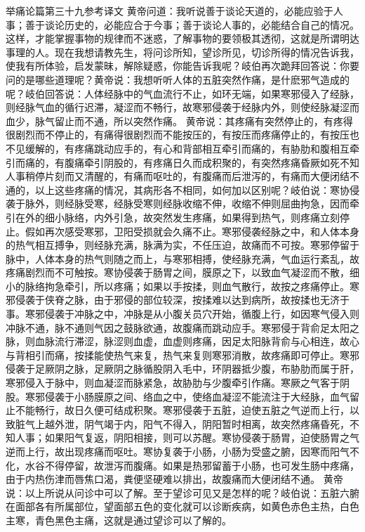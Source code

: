 \documentclass[a4paper,12pt,UTF8,twoside]{ctexbook}
\begin{document}
举痛论篇第三十九参考译文
黄帝问道：我听说善于谈论天道的，必能应验于人事；善于谈论历史的，必能应合于今事；善于谈论人事的，必能结合自己的情况。这样，才能掌握事物的规律而不迷惑，了解事物的要领极其透彻，这就是所谓明达事理的人。现在我想请教先生，将问诊所知，望诊所见，切诊所得的情况告诉我，使我有所体验，启发蒙昧，解除疑惑，你能告诉我呢？岐伯再次跪拜回答说：你要问的是哪些道理呢？黄帝说：我想听听人体的五脏突然作痛，是什麽邪气造成的呢？岐伯回答说：人体经脉中的气血流行不止，如环无端，如果寒邪侵入了经脉，则经脉气血的循行迟滞，凝涩而不畅行，故寒邪侵袭于经脉内外，则使经脉凝涩而血少，脉气留止而不通，所以突然作痛。
黄帝说：其疼痛有突然停止的，有疼得很剧烈而不停止的，有痛得很剧烈而不能按压的，有按压而疼痛停止的，有按压也不见缓解的，有疼痛跳动应手的，有心和背部相互牵引而痛的，有胁肋和腹相互牵引而痛的，有腹痛牵引阴股的，有疼痛日久而成积聚的，有突然疼痛昏厥如死不知人事稍停片刻而又清醒的，有痛而呕吐的，有腹痛而后泄泻的，有痛而大便闭结不通的，以上这些疼痛的情况，其病形各不相同，如何加以区别呢？岐伯说：寒协侵袭于脉外，则经脉受寒，经脉受寒则经脉收缩不伸，收缩不伸则屈曲拘急，因而牵引在外的细小脉络，内外引急，故突然发生疼痛，如果得到热气，则疼痛立刻停止。假如再次感受寒邪，卫阳受损就会久痛不止。寒邪侵袭经脉之中，和人体本身的热气相互搏争，则经脉充满，脉满为实，不任压迫，故痛而不可按。寒邪停留于脉中，人体本身的热气则随之而上，与寒邪相搏，使经脉充满，气血运行紊乱，故疼痛剧烈而不可触按。寒协侵袭于肠胃之间，膜原之下，以致血气凝涩而不散，细小的脉络拘急牵引，所以疼痛；如果以手按揉，则血气散行，故按之疼痛停止。寒邪侵袭于侠脊之脉，由于邪侵的部位较深，按揉难以达到病所，故按揉也无济于事。寒邪侵袭于冲脉之中，冲脉是从小腹关员穴开始，循腹上行，如因寒气侵入则冲脉不通，脉不通则气因之鼓脉欲通，故腹痛而跳动应手。寒邪侵于背俞足太阳之脉，则血脉流行滞涩，脉涩则血虚，血虚则疼痛，因足太阳脉背俞与心相连，故心与背相引而痛，按揉能使热气来复，热气来复则寒邪消散，故疼痛即可停止。寒邪侵袭于足厥阴之脉，足厥阴之脉循股阴入毛中，环阴器抵少腹，布胁肋而属于肝，寒邪侵入于脉中，则血凝涩而脉紧急，故胁肋与少腹牵引作痛。寒厥之气客于阴股。寒邪侵袭于小肠膜原之间、络血之中，使络血凝涩不能流注于大经脉，血气留止不能畅行，故日久便可结成积聚。寒邪侵袭于五脏，迫使五脏之气逆而上行，以致脏气上越外泄，阴气竭于内，阳气不得入，阴阳暂时相离，故突然疼痛昏死，不知人事；如果阳气复返，阴阳相接，则可以苏醒。寒协侵袭于肠胃，迫使肠胃之气逆而上行，故出现疼痛而呕吐。寒协复袭于小肠，小肠为受盛之腑，因寒而阳气不化，水谷不得停留，故泄泻而腹痛。如果是热邪留蓄于小肠，也可发生肠中疼痛，由于内热伤津而唇焦口渴，粪便坚硬难以排出，故腹痛而大便闭结不通。
黄帝说：以上所说从问诊中可以了解。至于望诊可见又是怎样的呢？岐伯说：五脏六腑在面部各有所属部位，望面部五色的变化就可以诊断疾病，如黄色赤色主热，白色主寒，青色黑色主痛，这就是通过望诊可以了解的。
\end{document}

